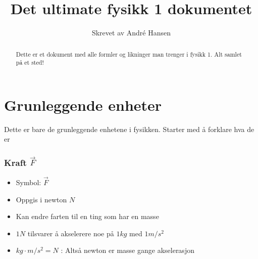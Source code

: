 \documentclass{article}
\title{Det ultimate fysikk 1 dokumentet}
\author{Skrevet av André Hansen}
\begin{document}
\maketitle

\tableofcontents

\begin{abstract}
    Dette er et dokument med alle formler og likninger man trenger i fysikk 1. 
    Alt samlet på et sted!
\end{abstract}

\section{Grunleggende enheter}

Dette er bare de grunleggende enhetene i fysikken. Starter med å forklare hva de er

\subsubsection{Kraft $\vec{F}$}

\begin{itemize}
    \item Symbol: $\vec{F}$
    \item Oppgis i newton $N$
    \item Kan endre farten til en ting som har en masse
    \item $1N$ tilsvarer å akselerere noe på $1kg$ med $1m/s^2$
    \item $kg \cdot m/s^2 = N$ : Altså newton er masse gange akselerasjon
\end{itemize}



\end{document}
